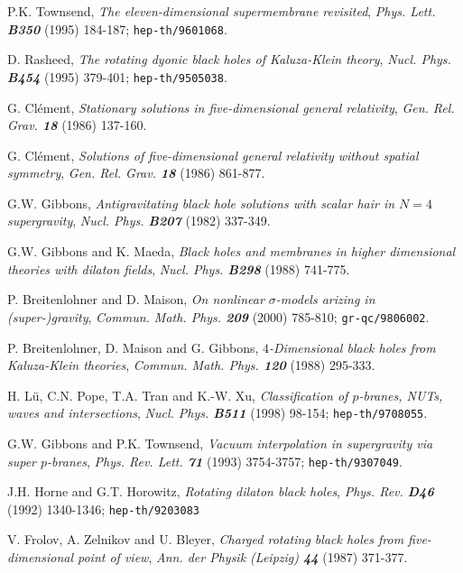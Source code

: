 \documentclass[a4paper,12pt]{article}
\begin{document}
\begin{thebibliography}{99}
    P.K. Townsend,
    {\sl The eleven-dimensional supermembrane revisited},
    {\it Phys. Lett. \bf B350} (1995) 184-187;
    {\tt hep-th/9601068}.

    D. Rasheed,
    {\sl The rotating dyonic black holes of Kaluza-Klein theory},
    {\it Nucl. Phys. \bf B454} (1995) 379-401;
    {\tt hep-th/9505038}.

    G. Cl\'ement,
    {\sl Stationary solutions in five-dimensional general relativity},
    {\it Gen. Rel. Grav. \bf 18} (1986) 137-160.

    G. Cl\'ement,
    {\sl Solutions of five-dimensional general relativity without
         spatial symmetry},
    {\it Gen. Rel. Grav. \bf 18} (1986) 861-877.

    G.W. Gibbons,
    {\sl Antigravitating black hole solutions with scalar hair in
         $N=4$ supergravity},
    {\it Nucl. Phys. \bf B207} (1982) 337-349.

    G.W. Gibbons and K. Maeda,
    {\sl Black holes and membranes in higher dimensional theories
         with dilaton fields},
    {\it Nucl. Phys. \bf B298} (1988) 741-775.

    P. Breitenlohner and D. Maison,
    {\sl On nonlinear $\sigma$-models arizing in (super-)gravity},
    {\it Commun. Math. Phys. \bf 209} (2000) 785-810;
    {\tt gr-qc/9806002}.

    P. Breitenlohner, D. Maison and G. Gibbons,
    {\sl $4$-Dimensional black holes from Kaluza-Klein theories},
    {\it Commun. Math. Phys. \bf 120} (1988) 295-333.

    H. L\"u, C.N. Pope, T.A. Tran and K.-W. Xu,
    {\sl Classification of $p$-branes, NUTs, waves and intersections},
    {\it Nucl. Phys. \bf B511} (1998) 98-154;
    {\tt hep-th/9708055}.

    G.W. Gibbons and P.K. Townsend,
    {\sl Vacuum interpolation in supergravity via super $p$-branes},
    {\it Phys. Rev. Lett. \bf 71} (1993) 3754-3757;
    {\tt hep-th/9307049}.

    J.H. Horne and G.T. Horowitz,
    {\sl Rotating dilaton black holes},
    {\it Phys. Rev. \bf D46} (1992) 1340-1346;
    {\tt hep-th/9203083}

    V. Frolov, A. Zelnikov and U. Bleyer,
    {\sl Charged rotating black holes from five-dimensional
         point of view},
    {\it Ann. der Physik (Leipzig) \bf 44} (1987) 371-377.


\end{thebibliography}
\end{document}
